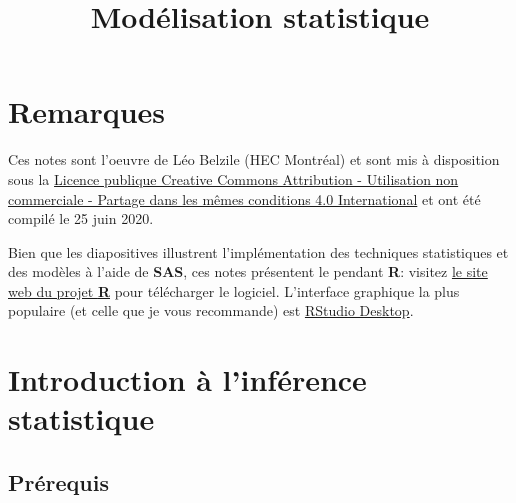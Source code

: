 \documentclass[
  11pt,
  letterpaper,
]{book}
\title{Modélisation statistique}
\author{}
\date{\vspace{-2.5em}}
\let\oldhref\href
\renewcommand{\href}[2]{#2\footnote{\url{#1}}}
\begin{document}
\maketitle

\let\href\oldhref

{
\setcounter{tocdepth}{1}
\tableofcontents
}
\hypertarget{remarques}{%
\chapter*{Remarques}\label{remarques}}

Ces notes sont l'oeuvre de Léo Belzile (HEC Montréal) et sont mis à disposition sous la \href{https://creativecommons.org/licenses/by-nc-sa/4.0/legalcode.fr}{Licence publique Creative Commons Attribution - Utilisation non commerciale - Partage dans les mêmes conditions 4.0 International} et ont été compilé le 25 juin 2020.

Bien que les diapositives illustrent l'implémentation des techniques statistiques et des modèles à l'aide de \textbf{SAS}, ces notes présentent le pendant \textbf{R}: visitez \href{https://cran.r-project.org/}{le site web du projet \textbf{R}} pour télécharger le logiciel. L'interface graphique la plus populaire (et celle que je vous recommande) est \href{https://www.rstudio.com/products/rstudio/download/}{RStudio Desktop}.

\newcommand{\bs}[1]{\boldsymbol{#1}}
\newcommand{\Hmat}{\mathbf{H}}
\newcommand{\Mmat}{\mathbf{M}}
\newcommand{\mX}{\mathbf{X}}
\newcommand{\bX}{{\mathbf{X}}}
\newcommand{\bx}{{\mathbf{x}}}
\newcommand{\by}{{\boldsymbol{y}}}
\newcommand{\bY}{{\boldsymbol{Y}}}
\newcommand{\eps}{\varepsilon}
\newcommand{\beps}{\boldsymbol{\varepsilon}}
\newcommand{\bbeta}{\boldsymbol{\beta}}
\newcommand{\hbb}{\widehat{\boldsymbol{\beta}}}
\newcommand{\limni}{\lim_{n \ra \infty}}
\newcommand{\pr}{{\mathsf Pr}{}}
\newcommand{\E}[2][]{{\mathsf E}_{#1}\left(#2\right)}
\newcommand{\Va}[2][]{{\mathsf{Var}_{#1}}\left(#2\right)}
\newcommand{\I}[1]{{\mathbf 1}_{#1}}
\renewcommand{\d}{\mathrm{d}}

\hypertarget{intro}{%
\chapter{Introduction à l'inférence statistique}\label{intro}}

\hypertarget{pruxe9requis}{%
\section{Prérequis}\label{pruxe9requis}}
\end{document}
